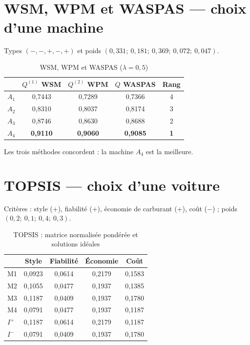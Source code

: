 \documentclass[11pt,a4paper]{report}
\theoremstyle{definition}
\theoremstyle{remark}
\begin{document}
\section{WSM, WPM et WASPAS --- choix d'une machine}

Types $(-,-,+,-,+)$ et poids $(0{,}331;\ 0{,}181;\ 0{,}369;\ 0{,}072;\ 0{,}047)$.

\begin{table}[H]
\centering
\caption{WSM, WPM et WASPAS ($\lambda=0{,}5$)}\label{tab:waspas}
\begin{tabular}{lcccc}
\toprule
 & $Q^{(1)}$ WSM & $Q^{(2)}$ WPM & $Q$ WASPAS & Rang\\
\midrule
$A_1$ & 0,7443 & 0,7289 & 0,7366 & 4\\
$A_2$ & 0,8310 & 0,8037 & 0,8174 & 3\\
$A_3$ & 0,8746 & 0,8630 & 0,8688 & 2\\
$A_4$ & \textbf{0,9110} & \textbf{0,9060} & \textbf{0,9085} & \textbf{1}\\
\bottomrule
\end{tabular}
\end{table}

Les trois méthodes concordent : la machine $A_4$ est la meilleure.

\section{TOPSIS --- choix d'une voiture}

Critères : style (+), fiabilité (+), économie de carburant (+), coût ($-$) ; poids
$(0{,}2;\ 0{,}1;\ 0{,}4;\ 0{,}3)$.

\begin{table}[H]
\centering
\caption{TOPSIS : matrice normalisée pondérée et solutions idéales}\label{tab:topsis1}
\begin{tabular}{lcccc}
\toprule
 & Style & Fiabilité & Économie & Coût\\
\midrule
M1 & 0,0923 & 0,0614 & 0,2179 & 0,1583\\
M2 & 0,1055 & 0,0477 & 0,1937 & 0,1385\\
M3 & 0,1187 & 0,0409 & 0,1937 & 0,1780\\
M4 & 0,0791 & 0,0477 & 0,1937 & 0,1187\\
\midrule
$I^+$ & 0,1187 & 0,0614 & 0,2179 & 0,1187\\
$I^-$ & 0,0791 & 0,0409 & 0,1937 & 0,1780\\
\bottomrule
\end{tabular}
\end{table}
\end{document}
